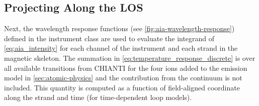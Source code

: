 \subsection{Projecting Along the LOS}

Next, the wavelength response functions (see \autoref{fig:aia-wavelength-response}) defined in the instrument class are used to evaluate the integrand of \autoref{eq:aia_intensity} for each channel of the instrument and each strand in the magnetic skeleton. The summation in \autoref{eq:temperature_response_discrete} is over all available transitions from CHIANTI for the four ions added to the emission model in \autoref{sec:atomic-physics} and the contribution from the continuum is not included. This quantity is computed as a function of field-aligned coordinate along the strand and time (for time-dependent loop models).

